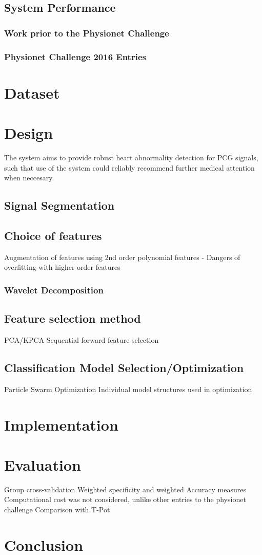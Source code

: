 \documentclass[titlepage, 12pt]{scrartcl} \usepackage{enumitem}
\begin{document}
\subsection{System Performance}\label{performance}
\subsubsection{Work prior to the Physionet Challenge}
\subsubsection{Physionet Challenge 2016 Entries}


\section{Dataset}

\section{Design}
The system aims to provide robust heart abnormality detection for PCG signals,
such that use of the system could reliably recommend further medical attention
when neccesary.
\subsection{Signal Segmentation}
\subsection{Choice of features}

Augmentation of features using 2nd order polynomial features
- Dangers of overfitting with higher order features
\subsubsection{Wavelet Decomposition}
\subsection{Feature selection method}
PCA/KPCA
Sequential forward feature selection
\subsection{Classification Model Selection/Optimization}
Particle Swarm Optimization
Individual model structures used in optimization

\section{Implementation}
\section{Evaluation}
Group cross-validation
Weighted specificity and weighted Accuracy measures
Computational cost was not considered, unlike other entries to the physionet
challenge
Comparison with T-Pot
\section{Conclusion}



\pagebreak{}
\printbibliography{}
\end{document}
